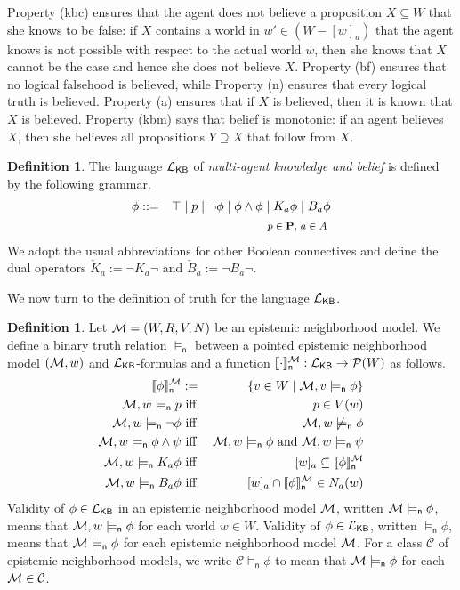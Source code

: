\documentclass[12pt]{article}
\theoremstyle{definition}
\newtheorem{definition}[theorem]{Definition}
\newcommand{\pow}{{\cal P}}    %
\newcommand{\M}{{\cal M}}      %
\newcommand{\Prop}{{\bf P}}    %
\newcommand{\Lang}{{\cal L}}   %
\newcommand{\KB}{{\mathsf{KB}}}                        %
\newcommand{\modelsn}{\models_{\mathsf{n}}}                  %
\newcommand{\semn}[1]{\llbracket{#1}\rrbracket_{\mathsf{n}}} %
\begin{document}
Property (kbc) ensures that the agent does not believe a proposition
$X\subseteq W$ that she knows to be false: if $X$ contains a world in
$w'\in(W-[w]_a)$ that the agent knows is not possible with respect to
the actual world $w$, then she knows that $X$ cannot be the case and
hence she does not believe $X$.  Property (bf) ensures that no logical
falsehood is believed, while Property (n) ensures that every logical
truth is believed.  Property (a) ensures that if $X$ is believed, then
it is known that $X$ is believed.  Property (kbm) says that belief is
monotonic: if an agent believes $X$, then she believes all
propositions $Y\supseteq X$ that follow from $X$.

\begin{definition}
  The language $\Lang_\KB$ of \emph{multi-agent knowledge and belief}
  is defined by the following grammar.
  \begin{eqnarray*}
    \phi & ::= & 
    \top \mid p \mid \neg\phi \mid \phi\land\phi \mid
    K_a\phi \mid B_a\phi
    \\
    &&
    \text{\footnotesize 
      $p\in\Prop$,
      $a\in A$
    }
  \end{eqnarray*}
  We adopt the usual abbreviations for other Boolean connectives and
  define the dual operators $\check K_a:=\lnot K_a\lnot$ and $\check
  B_a:=\lnot B_a\lnot$.
\end{definition}

We now turn to the definition of truth for the language $\Lang_\KB$.

\begin{definition}
  \label{definition:LKB-truth}
  Let $\M = (W,R,V,N)$ be an epistemic neighborhood model.  We define
  a binary truth relation $\modelsn$ between a pointed epistemic
  neighborhood model $(\M,w)$ and $\Lang_\KB$-formulas and a function
  $\semn{\cdot}^\M:\Lang_\KB\to \pow(W)$ as follows.
  \begin{eqnarray*} 
    \semn{\phi}^\M & := & \{v\in W\mid \M,v\modelsn\phi\}
    \\
    \M, w \modelsn p & \text{ iff } & p \in V(w) 
    \\
    \M, w \modelsn \neg \phi & \text{ iff } & \M, w \not\modelsn \phi 
    \\
    \M, w \modelsn \phi\land\psi  & \text{ iff } 
    & \M, w \modelsn \phi \text{ and } \M, w \modelsn \psi
    \\
    \M, w \modelsn K_a \phi  & \text{ iff } & 
    [w]_a\subseteq\semn{\phi}^\M
    \\
    \M, w \modelsn B_a \phi  & \text{ iff } &
    [w]_a\cap \semn{\phi}^\M \in N_a(w)
  \end{eqnarray*}
  Validity of $\phi\in\Lang_\KB$ in an epistemic neighborhood model
  $\M$, written $\M\modelsn\phi$, means that $\M,w\modelsn\phi$ for
  each world $w\in W$.  Validity of $\phi\in\Lang_\KB$, written
  $\modelsn\phi$, means that $\M\modelsn\phi$ for each epistemic
  neighborhood model $\M$.  For a class $\mathcal{C}$ of epistemic
  neighborhood models, we write $\mathcal{C}\modelsn\phi$ to mean that
  $\M\modelsn\phi$ for each $\M\in\mathcal{C}$.
\end{definition}
\end{document}
